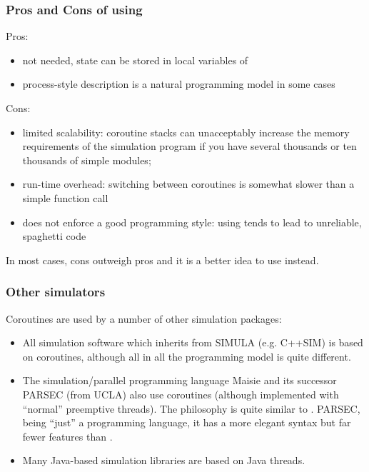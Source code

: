 \subsubsection{Pros and Cons of using }


Pros:
\begin{itemize}
   \item{ not needed, state can be stored in local
       variables of }
   \item{process-style description is a natural programming model in some cases}
\end{itemize}

Cons:
\begin{itemize}
   \item{limited scalability: coroutine stacks can unacceptably increase the
       memory requirements of the simulation program if you have several
       thousands or ten thousands of simple modules;}
   \item{run-time overhead: switching between coroutines is somewhat slower
       than a simple function call}
   \item{does not enforce a good programming style: using 
       tends to lead to unreliable, spaghetti code}
\end{itemize}

In most cases, cons outweigh pros and it is a better idea to use
 instead.


\subsubsection{Other simulators}


Coroutines are used by a number of other simulation packages:
\begin{itemize}
\item{All simulation software which inherits from SIMULA (e.g. C++SIM)
    is based on coroutines, although all in all the programming
    model is quite different.}
\item{The simulation/parallel programming language Maisie and its successor
    PARSEC (from UCLA) also use coroutines (although implemented
    with ``normal'' preemptive threads). The philosophy
    is quite similar to {\opp}. PARSEC, being ``just''
    a programming language, it has a more elegant syntax but far fewer
    features than {\opp}.}
\item{Many Java-based simulation libraries are based on Java
    threads.}
\end{itemize}





